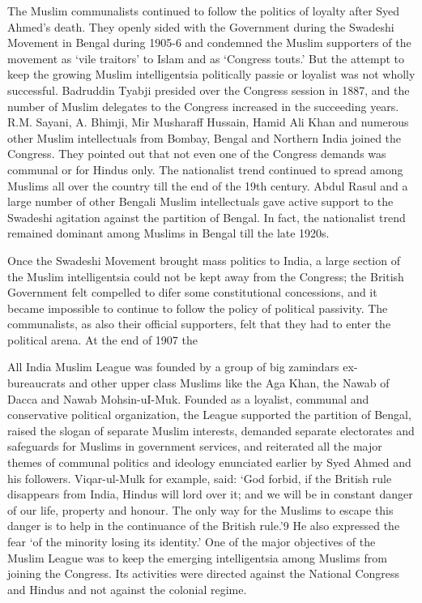 The Muslim communalists continued to follow the politics of loyalty after Syed Ahmed’s death. They openly sided with the Government during the Swadeshi Movement in Bengal during 1905-6 and condemned the Muslim supporters of the movement as ‘vile traitors’ to Islam and as ‘Congress touts.’ But the attempt to keep the growing Muslim intelligentsia politically passie or loyalist was not wholly successful. Badruddin Tyabji presided over the Congress session in 1887, and the number of Muslim delegates to the Congress increased in the succeeding years. R.M. Sayani, A. Bhimji, Mir Musharaff Hussain, Hamid Ali Khan and numerous other Muslim intellectuals from Bombay, Bengal and Northern India joined the Congress. They pointed out that not even one of the Congress demands was communal or for Hindus only. The nationalist trend continued to spread among Muslims all over the country till the end of the 19th century. Abdul Rasul and a large number of other Bengali Muslim intellectuals gave active support to the Swadeshi agitation against the partition of Bengal. In fact, the nationalist trend remained dominant among Muslims in Bengal till the late 1920s. 

Once the Swadeshi Movement brought mass politics to India, a large section of the Muslim intelligentsia could not be kept away from the Congress; the British Government felt compelled to difer some constitutional concessions, and it became impossible to continue to follow the policy of political passivity. The communalists, as also their official supporters, felt that they had to enter the political arena. At the end of 1907 the 

All India Muslim League was founded by a group of big zamindars ex-bureaucrats and other upper class Muslims like the Aga Khan, the Nawab of Dacca and Nawab Mohsin-uI-Muk. Founded as a loyalist, communal and conservative political organization, the League supported the partition of Bengal, raised the slogan of separate Muslim interests, demanded separate electorates and safeguards for Muslims in government services, and reiterated all the major themes of communal politics and ideology enunciated earlier by Syed Ahmed and his followers. Viqar-ul-Mulk for example, said: ‘God forbid, if the British rule disappears from India, Hindus will lord over it; and we will be in constant danger of our life, property and honour. The only way for the Muslims to escape this danger is to help in the continuance of the British rule.’9 He also expressed the fear ‘of the minority losing its identity.’ One of the major objectives of the Muslim League was to keep the emerging intelligentsia among Muslims from joining the Congress. Its activities were directed against the National Congress and Hindus and not against the colonial regime. 

